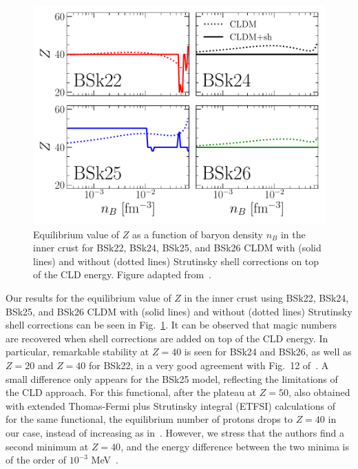 \begin{figure}[!t]
\begin{center}
  \includegraphics[width=0.9\linewidth]{figures/icrust_compo_bsk.pdf}
\end{center}
\caption[Equilibrium value of $Z$ versus baryon density in the inner crust
with Strutinsky shell corrections]{Equilibrium value of $Z$ as a function of 
  baryon density $n_B$ in the inner crust for BSk22, BSk24, BSk25, and BSk26 
  CLDM with (solid lines) and without (dotted lines) Strutinsky shell 
  corrections on top of the CLD energy. Figure adapted 
from~\cite{Carreau2019}.}\label{fig:icrust_compo_bsk}
\end{figure}

Our results for the equilibrium value of $Z$ in the inner crust using BSk22, 
BSk24, BSk25, and BSk26 CLDM with (solid lines) and without (dotted lines)
Strutinsky shell corrections can be seen in Fig.~\ref{fig:icrust_compo_bsk}.
It can be observed that magic numbers are recovered when shell corrections are
added on top of the CLD energy. In particular, remarkable stability at $Z=40$
is seen for BSk24 and BSk26, as well as $Z=20$ and $Z=40$ for BSk22, in a very 
good agreement with Fig.~12 of~\cite{Pearson2018}. A small difference only
appears for the BSk25 model, reflecting the limitations of the CLD approach.
For this functional, after the plateau at $Z=50$, also obtained with extended
Thomas-Fermi plus Strutinsky integral (ETFSI) calculations
of~\cite{Pearson2018} for the same functional, the equilibrium number of
protons drops to $Z=40$ in our case, instead of increasing as
in~\cite{Pearson2018}. However, we stress that the authors find a second 
minimum at $Z=40$, and the energy difference between the two minima is of 
the order of $10^{-3}$ MeV~\cite{Pearson2019}.

